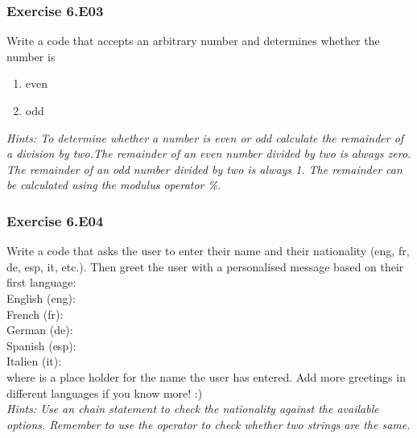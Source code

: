 \newpage
\subsubsection*{Exercise 6.E03 \red{[M]}}
Write a code that accepts an arbitrary number and determines whether the number is
\begin{enumerate}[label=(\alph*)]
	\item even
	\item odd
\end{enumerate}


\textit{Hints:
To determine whether a number is even or odd calculate the remainder of a division by two.The remainder of an even number divided by two is always zero. The remainder of an odd
number divided by two is always 1. The remainder can be calculated using the modulus
operator \%.}\\[1cm]



\subsubsection*{Exercise 6.E04}
Write a code that asks the user to enter their name and their nationality (eng, fr, de, esp, it, etc.). Then greet the user with a personalised message based on their first language:\\
\hspace*{5mm}English (eng): {}\\
\hspace*{5mm}French (fr): {}\\
\hspace*{5mm}German (de): {}\\
\hspace*{5mm}Spanish (esp): {}\\
\hspace*{5mm}Italien (it): {}\\
where {\code{[NAME]}} is a place holder for the name the user has entered. Add more greetings in different languages if you know more! :)\\


\textit{Hints:
Use an {} chain statement to check the nationality against the available
options. Remember to use the {\code{==}} operator to check whether two strings are the same.}\\[1cm]


